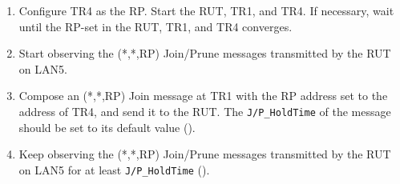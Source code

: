 \documentclass[11pt]{report}
\begin{document}
\begin{enumerate}

  \item Configure TR4 as the RP. Start the RUT, TR1, and TR4. If
  necessary, wait until the RP-set in the RUT, TR1, and TR4
  converges.

  \item Start observing the (*,*,RP) Join/Prune messages transmitted by the
  RUT on LAN5.

  \item Compose an (*,*,RP) Join message at TR1 with the RP address set to the
  address of TR4, and send it to the RUT. 
  The \verb=J/P_HoldTime= of the message should be set to its default
  value ({\PimsmJPHoldTime}).

  \item Keep observing the (*,*,RP) Join/Prune messages transmitted by the
  RUT on LAN5 for at least \verb=J/P_HoldTime= ({\PimsmJPHoldTime}).

\end{enumerate}

\end{document}
